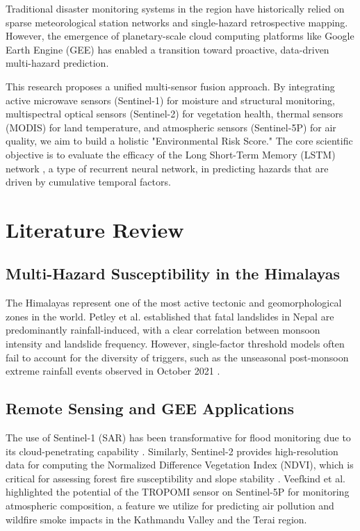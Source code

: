 \documentclass[journal,twoside]{IEEEtran}
\begin{document}
Traditional disaster monitoring systems in the region have historically relied on sparse meteorological station networks and single-hazard retrospective mapping. However, the emergence of planetary-scale cloud computing platforms like Google Earth Engine (GEE) \cite{gorelick2017google} has enabled a transition toward proactive, data-driven multi-hazard prediction. 

This research proposes a unified multi-sensor fusion approach. By integrating active microwave sensors (Sentinel-1) for moisture and structural monitoring, multispectral optical sensors (Sentinel-2) for vegetation health, thermal sensors (MODIS) for land temperature, and atmospheric sensors (Sentinel-5P) for air quality, we aim to build a holistic "Environmental Risk Score." The core scientific objective is to evaluate the efficacy of the Long Short-Term Memory (LSTM) network \cite{hochreiter1997lstm}, a type of recurrent neural network, in predicting hazards that are driven by cumulative temporal factors.

\section{Literature Review}

\subsection{Multi-Hazard Susceptibility in the Himalayas}
The Himalayas represent one of the most active tectonic and geomorphological zones in the world. Petley et al. \cite{petley2007landslides} established that fatal landslides in Nepal are predominantly rainfall-induced, with a clear correlation between monsoon intensity and landslide frequency. However, single-factor threshold models often fail to account for the diversity of triggers, such as the unseasonal post-monsoon extreme rainfall events observed in October 2021 \cite{thapa2021melamchi}.

\subsection{Remote Sensing and GEE Applications}
The use of Sentinel-1 (SAR) has been transformative for flood monitoring due to its cloud-penetrating capability \cite{torres2012sentinel1}. Similarly, Sentinel-2 provides high-resolution data for computing the Normalized Difference Vegetation Index (NDVI), which is critical for assessing forest fire susceptibility and slope stability \cite{drusch2012sentinel}. Veefkind et al. \cite{veefkind2012sentinel5p} highlighted the potential of the TROPOMI sensor on Sentinel-5P for monitoring atmospheric composition, a feature we utilize for predicting air pollution and wildfire smoke impacts in the Kathmandu Valley and the Terai region.
\end{document}

